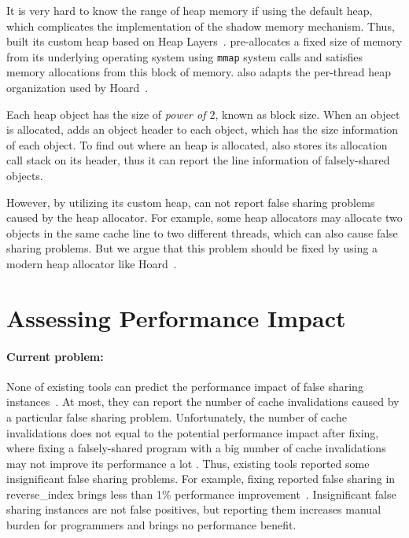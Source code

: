 It is very hard to know the range of heap memory if using the default heap, which complicates the implementation of the shadow memory mechanism. Thus, \cheetah{} built its custom heap based on Heap Layers~\cite{heaplayers}. \cheetah{} pre-allocates a fixed size of memory
from its underlying operating system using \texttt{mmap} system calls and satisfies memory allocations from this block of memory. \cheetah{} also adapts the per-thread heap organization used by Hoard~\cite{Hoard}. 

Each heap object has the size of {\it power of $2$}, known as block size. When an object is allocated, \cheetah{} adds an object header to each object, which has the size information of each object. To find out where an heap is allocated, \cheetah{} also stores its allocation call stack on its header, thus it can report the line information of falsely-shared objects. 

However, by utilizing its custom heap, \cheetah{} can not report false sharing problems caused by the heap allocator. For example, some heap allocators may allocate two objects in the same cache line to two different threads, which can also cause false sharing problems. But we argue that this problem should be fixed by using a modern heap allocator like Hoard~\cite{Hoard}.  

\section{Assessing Performance Impact}
\label{sec:predictidea}

\paragraph{Current problem:} None of existing tools can predict the performance impact of false sharing instances~\cite{sheriff, Predator, openmp}. At most, they can report the number of cache invalidations caused by a particular false sharing problem. Unfortunately, the number of cache invalidations does not equal to the potential performance impact after fixing, where fixing a falsely-shared program with a big number of cache invalidations may not improve its performance a lot . Thus, existing tools reported some insignificant false sharing problems. For example, fixing reported false sharing in reverse\_index brings less than 1\% performance improvement~\cite{sheriff, Predator}. Insignificant false sharing instances are not false positives, but reporting them increases manual burden for programmers and brings no performance benefit. 

